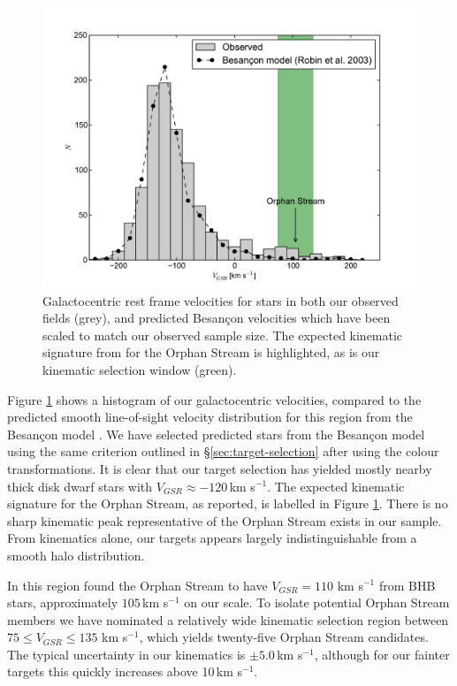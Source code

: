 \documentclass{emulateapj}
\begin{document}
\begin{figure}[h]
	\includegraphics[width=\columnwidth]{./figures/vgsr-histogram.pdf}
	\caption{Galactocentric rest frame velocities for stars in both our observed fields (grey), and predicted Besan\c{c}on velocities which have been scaled to match our observed sample size. The expected kinematic signature from \citet{Newberg;et-al_2010} for the Orphan Stream is highlighted, as is our kinematic selection window (green).}
	\label{fig:velocities}
\end{figure}

Figure \ref{fig:velocities} shows a histogram of our galactocentric velocities, compared to the predicted smooth line-of-sight velocity distribution for this region from the Besan\c{c}on model \citep{Robin;et-al_2003}. We have selected predicted stars from the Besan\c{c}on model using the same criterion outlined in \S\ref{sec:target-selection} after using the \citet{Jordi;et-al_2006} colour transformations. It is clear that our target selection has yielded mostly nearby thick disk dwarf stars with $V_{GSR} \approx -120$\,km s$^{-1}$. The expected kinematic signature for the Orphan Stream, as \citet{Newberg;et-al_2010} reported, is labelled in Figure \ref{fig:velocities}. There is no sharp kinematic peak representative of the Orphan Stream exists in our sample. From kinematics alone, our targets appears largely indistinguishable from a smooth halo distribution.

In this region \citet{Newberg;et-al_2010} found the Orphan Stream to have $V_{GSR} = 110$ km s$^{-1}$ from BHB stars, approximately $105$\,km s$^{-1}$ on our scale. To isolate potential Orphan Stream members we have nominated a relatively wide kinematic selection region between $75 \leq V_{GSR} \leq 135$ km s$^{-1}$, which yields twenty-five Orphan Stream candidates. The typical uncertainty in our kinematics is $\pm{}5.0$\,km s$^{-1}$, although for our fainter targets this quickly increases above 10\,km s$^{-1}$.
\end{document}
